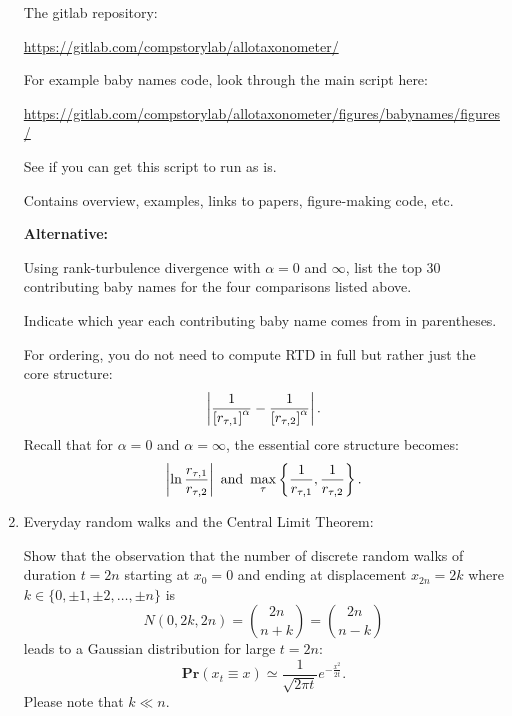 \begin{enumerate}
  The gitlab repository:

  \url{https://gitlab.com/compstorylab/allotaxonometer/}

  For example baby names code, look through the main script here:
  
  \url{https://gitlab.com/compstorylab/allotaxonometer/figures/babynames/figures/}

  See if you can get this script to run as is.

  Contains overview, examples, links to papers, figure-making code, etc.

  
   \solutionstart


   \solutionend

  \textbf{Alternative:}

  Using rank-turbulence divergence with $\alpha = 0$ and $\infty$,
  list the top 30 contributing baby names for the four comparisons listed above.
  
  Indicate which year each contributing baby name comes from in parentheses.

  For ordering, you do not need to compute RTD in full but rather just the core structure:
  \begin{equation}
  \left\lvert
  \frac{1}{\left[r_{\tau,1}\right]^{\alpha}}
  -
  \frac{1}{\left[r_{\tau,2}\right]^{\alpha}}
  \right\lvert.
  \label{eq:pocs-asst05.allotax-core}
  \end{equation}
  Recall that for $\alpha=0$ and $\alpha=\infty$, the essential core structure becomes:
  \begin{equation}
    \left\lvert
    \ln
    \frac{r_{\tau,1}
    }{r_{\tau,2}}
    \right\rvert
    \
    \mbox{and}
    \
    \max_{\tau}
    \left\{
    \frac{
      1
    }{
      r_{\tau,1}
    },
    \frac{
      1
    }{
      r_{\tau,2}
    }
    \right\}.
    \label{eq:pocs-asst05.allotax-core-alpha-0-and-infty}
  \end{equation}

  
   \solutionstart


   \solutionend

\item 
  Everyday random walks and the Central Limit Theorem:

  Show that the observation
  that the number of discrete random walks of duration
  $t=2n$ starting at $x_{0}=0$ and ending at displacement $x_{2n} = 2k$ where
  $k \in \{0, \pm 1, \pm 2, \ldots, \pm n\}$
  is
  $$
  N(0,2k,2n)
  =
  \binom{2n}{n+k}
  =
  \binom{2n}{n-k}
  $$
  leads to a Gaussian distribution for large $t=2n$:
  $$
  \mathbf{Pr}(x_{t} \equiv x) 
  \simeq
  \frac{1}{\sqrt{2\pi t}}
  e^{-\frac{x^2}{2t}}.
  $$
  Please note that $k \ll n$.


\end{enumerate}
